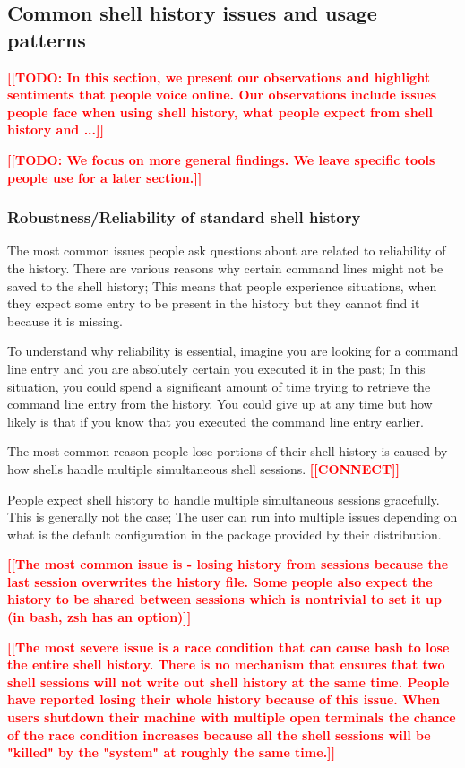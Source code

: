 \documentclass[thesis=M,english]{FITthesis}[2012/10/20]
\newcommand{\todotext}[1]{\textcolor{red}{\textbf{[[#1]]}}}
\begin{document}
\subsection{Common shell history issues and usage patterns}

\todotext{TODO: In this section, we present our observations and highlight sentiments that people voice online. Our observations include issues people face when using shell history, what people expect from shell history and ...}

\todotext{TODO: We focus on more general findings. We leave specific tools people use for a later section.}


\subsubsection*{Robustness/Reliability of standard shell history}

The most common issues people ask questions about are related to reliability of the history.
There are various reasons why certain command lines might not be saved to the shell history; This means that people experience situations, when they expect some entry to be present in the history  but they cannot find it because it is missing.

To understand why reliability is essential, imagine you are looking for a command line entry and you are absolutely certain you executed it in the past; In this situation, you could spend a significant amount of time trying to retrieve the command line entry from the history. You could give up at any time but how likely is that if you know that you executed the command line entry earlier.

The most common reason people lose portions of their shell history is caused by how shells handle multiple simultaneous shell sessions.    
\todotext{CONNECT}

People expect shell history to handle multiple simultaneous sessions gracefully. This is generally not the case; The user can run into multiple issues depending on what is the default configuration in the package provided by their distribution.

\todotext{The most common issue is - losing history from sessions because the last session overwrites the history file. Some people also expect the history to be shared between sessions which is nontrivial to set it up (in bash, zsh has an option)}


\todotext{The most severe issue is a race condition that can cause bash to lose the entire shell history. There is no mechanism that ensures that two shell sessions will not write out shell history at the same time. People have reported losing their whole history because of this issue. When users shutdown their machine with multiple open terminals the chance of the race condition increases because all the shell sessions will be "killed" by the "system" at roughly the same time.}
\end{document}
